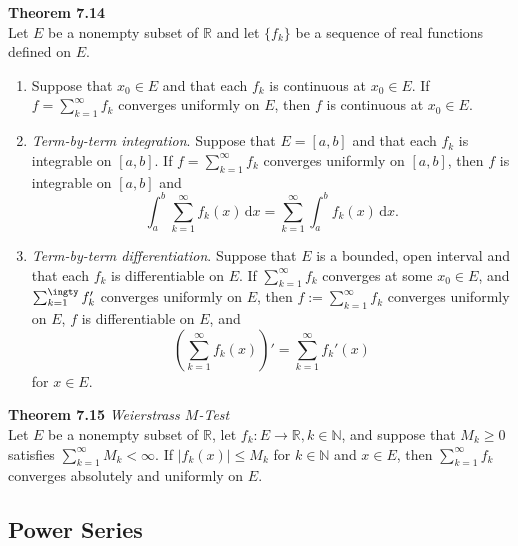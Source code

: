 \documentclass[8pt,landscape]{article}
\begin{document}
\begin{multicols}{3}
\textbf{Theorem 7.14} \\
Let $E$ be a nonempty subset of $\mathbb{R}$ and let $\{f_k\}$ be a sequence of real
functions defined on $E$.
\begin{enumerate}
    \item Suppose that $x_0 \in E$ and that each $f_k$ is continuous at $x_0 \in E$.
        If $f = \sum_{k=1}^\infty f_k$ converges uniformly on $E$, then $f$ is
        continuous at $x_0 \in E$.
    \item \emph{Term-by-term integration}.
        Suppose that $E = [a, b]$ and that each $f_k$ is integrable on $[a, b]$.
        If $f = \sum_{k=1}^\infty f_k$ converges uniformly on $[a, b]$, then $f$
        is integrable on $[a, b]$ and
        \[
            \int_a^b \sum_{k=1}^\infty f_k(x)\, \mathrm{d}x =
            \sum_{k=1}^\infty \int_a^b f_k(x)\, \mathrm{d}x.
        \]
    \item \emph{Term-by-term differentiation}.
        Suppose that $E$ is a bounded, open interval and that each $f_k$ is
        differentiable on $E$.
        If $\sum_{k=1}^\infty f_k$ converges at some $x_0 \in E$,
        and $\sum_{k=1}^\ingty f_k'$ converges uniformly on $E$,
        then $f := \sum_{k=1}^\infty f_k$ converges uniformly on $E$,
        $f$ is differentiable on $E$, and
        \[
            \left( \sum_{k=1}^\infty f_k(x) \right)' =
            \sum_{k=1}^\infty f_k'(x)
        \]
        for $x \in E$.
\end{enumerate}

\textbf{Theorem 7.15} \emph{Weierstrass $M$-Test} \\
Let $E$ be a nonempty subset of $\mathbb{R}$,
let $f_k : E \to \mathbb{R}, k \in \mathbb{N}$,
and suppose that $M_k \geq 0$ satisfies $\sum_{k=1}^\infty M_k < \infty$.
If $|f_k(x)| \leq M_k$ for $k \in \mathbb{N}$ and $x \in E$, then
$\sum_{k=1}^\infty f_k$ converges absolutely and uniformly on $E$.


\subsection{Power Series}


\end{multicols}
\end{document}
